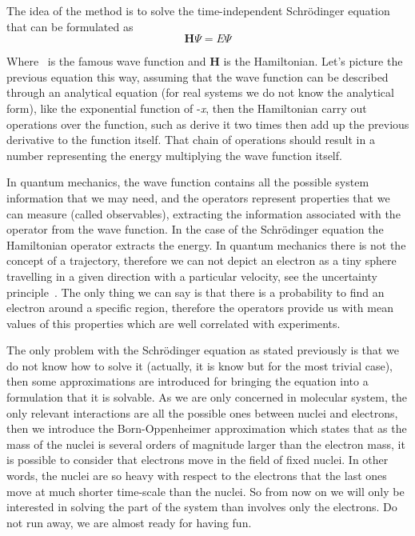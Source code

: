 \documentclass{tmr}
\begin{document}
\par The idea of the method is to solve the time-independent Schr\"{o}dinger
 equation that can be formulated as
\[ \mathbf{H}\Psi = E\Psi \]

Where \textPsi\ is the famous wave function and \textbf{H} is the Hamiltonian. 
Let's picture the previous equation this way, assuming that the wave function 
can be described through an analytical equation (for real systems we do not know the analytical form),
like the exponential function of -\textit{\textalpha x},
then the Hamiltonian carry out operations over the function, such as derive it two times 
then add up the previous derivative to the function itself.
That chain of operations should result in a number representing the energy
multiplying the wave function itself.
\par In quantum mechanics, the wave function contains all the possible system information that 
we may need, and the operators represent properties that we can measure (called observables),
extracting the information associated with the operator from the wave function.
In the case of the Schr\"odinger equation the Hamiltonian operator extracts the energy. 
In quantum mechanics there is not the concept of a trajectory, therefore we can not depict an electron
as a tiny sphere travelling in a given direction with a particular velocity,
see the uncertainty principle~\cite{uncertainty}. The only thing
we can say is that there is a probability to find an electron
around a specific region, therefore the operators provide us with mean values of this properties which are
well correlated with experiments. 

\par The only problem with the Schr\"odinger equation as stated previously
is that we do not know how to solve it 
(actually, it is know but for the most trivial case),
then some approximations are introduced for bringing the equation into 
a formulation that it is solvable. As we are only concerned
in molecular system, the only relevant interactions are all the possible ones
between nuclei and electrons, then we
introduce the Born-Oppenheimer approximation which states that as the mass of the nuclei is several 
orders of magnitude larger than the electron mass, it is possible to consider that electrons move in the 
field of fixed nuclei. In other words, the nuclei are so heavy with respect to the electrons that the last ones move 
at much shorter time-scale than the nuclei. So from now on we will only be interested in solving 
the part of the system than involves only the electrons. Do not run away, we are almost ready for having fun.
\end{document}
